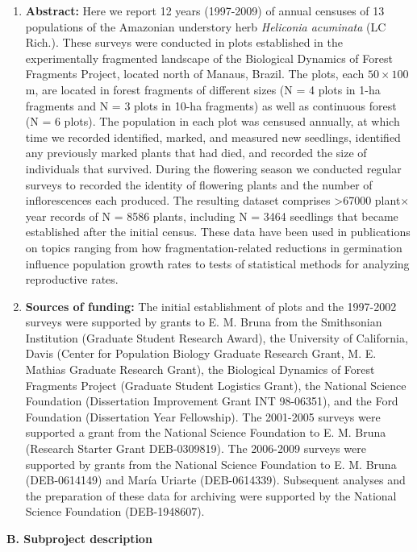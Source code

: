 \documentclass[
  12pt,
  man, donotrepeattitle]{apa6}
\begin{document}
\begin{enumerate}
\def\labelenumi{\arabic{enumi}.}
\setcounter{enumi}{4}
\item
  \textbf{Abstract:} Here we report 12 years (1997-2009) of annual censuses of 13 populations of the Amazonian understory herb \emph{Heliconia acuminata} (LC Rich.). These surveys were conducted in plots established in the experimentally fragmented landscape of the Biological Dynamics of Forest Fragments Project, located north of Manaus, Brazil. The plots, each \(50\times100\)m, are located in forest fragments of different sizes (N = 4 plots in 1-ha fragments and N = 3 plots in 10-ha fragments) as well as continuous forest (N = 6 plots). The population in each plot was censused annually, at which time we recorded identified, marked, and measured new seedlings, identified any previously marked plants that had died, and recorded the size of individuals that survived. During the flowering season we conducted regular surveys to recorded the identity of flowering plants and the number of inflorescences each produced. The resulting dataset comprises \textgreater67000 plant\(\times\)year records of N = 8586 plants, including N = 3464 seedlings that became established after the initial census. These data have been used in publications on topics ranging from how fragmentation-related reductions in germination influence population growth rates to tests of statistical methods for analyzing reproductive rates.
\item
  \textbf{Sources of funding:} The initial establishment of plots and the 1997-2002 surveys were supported by grants to E. M. Bruna from the Smithsonian Institution (Graduate Student Research Award), the University of California, Davis (Center for Population Biology Graduate Research Grant, M. E. Mathias Graduate Research Grant), the Biological Dynamics of Forest Fragments Project (Graduate Student Logistics Grant), the National Science Foundation (Dissertation Improvement Grant INT 98-06351), and the Ford Foundation (Dissertation Year Fellowship). The 2001-2005 surveys were supported a grant from the National Science Foundation to E. M. Bruna (Research Starter Grant DEB-0309819). The 2006-2009 surveys were supported by grants from the National Science Foundation to E. M. Bruna (DEB-0614149) and María Uriarte (DEB-0614339). Subsequent analyses and the preparation of these data for archiving were supported by the National Science Foundation (DEB-1948607).
\end{enumerate}

\noindent  
\textbf{B. Subproject description}
\end{document}
